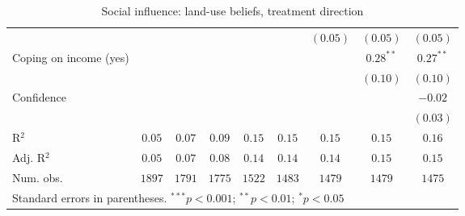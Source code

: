 \begin{table}[h]
\begin{center}
\begin{tabular}{l c c c c c c c c}
                                                             &              &               &               &               &               & $(0.05)$      & $(0.05)$      & $(0.05)$      \\
Coping on income (yes)                                       &              &               &               &               &               &               & $0.28^{**}$   & $0.27^{**}$   \\
                                                             &              &               &               &               &               &               & $(0.10)$      & $(0.10)$      \\
Confidence                                                   &              &               &               &               &               &               &               & $-0.02$       \\
                                                             &              &               &               &               &               &               &               & $(0.03)$      \\
\hline
R$^2$                                                        & $0.05$       & $0.07$        & $0.09$        & $0.15$        & $0.15$        & $0.15$        & $0.15$        & $0.16$        \\
Adj. R$^2$                                                   & $0.05$       & $0.07$        & $0.08$        & $0.14$        & $0.14$        & $0.14$        & $0.15$        & $0.15$        \\
Num. obs.                                                    & $1897$       & $1791$        & $1775$        & $1522$        & $1483$        & $1479$        & $1479$        & $1475$        \\
\hline
\multicolumn{9}{l}{\scriptsize{Standard errors in parentheses. $^{***}p<0.001$; $^{**}p<0.01$; $^{*}p<0.05$}}
\end{tabular}
\caption{Social influence: land-use beliefs, treatment direction}
\label{table:social_influence_landemi_treatment_direction}
\end{center}
\end{table}
